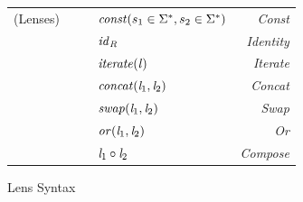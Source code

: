 \documentclass[numbers]{sigplanconf}
\begin{document}
\begin{figure}
\centering
\begin{tabular}{l@{\ }l@{\ }c@{\ }l@{\ }>{\itshape\/}r}
(Lenses)& \Lens{} & \GEq{} & $\mathit{const}(s_1 \in {\ensuremath{\Sigma}}^*,s_2 \in {\ensuremath{\Sigma}}^*)$ & Const \\
& & & \GBar{} $\mathit{id}_{\mathit{R}}$ & Identity\\
& & & \GBar{} $\mathit{iterate(\mathit{l})}$ & Iterate \\
& & & \GBar{} $\mathit{concat}(\mathit{l}_1,\mathit{l}_2)$ & Concat \\
& & & \GBar{} $\mathit{swap}(\mathit{l}_1,\mathit{l}_2)$ & Swap\\
& & & \GBar{} $\mathit{or}(\mathit{l}_1,\mathit{l}_2)$ & Or\\
& & & \GBar{} $\mathit{l}_1 \circ \mathit{l}_2$ & Compose\\
\end{tabular}
\caption{Lens Syntax}
\label{fig:lens-syntax}
\end{figure}
\end{document}
